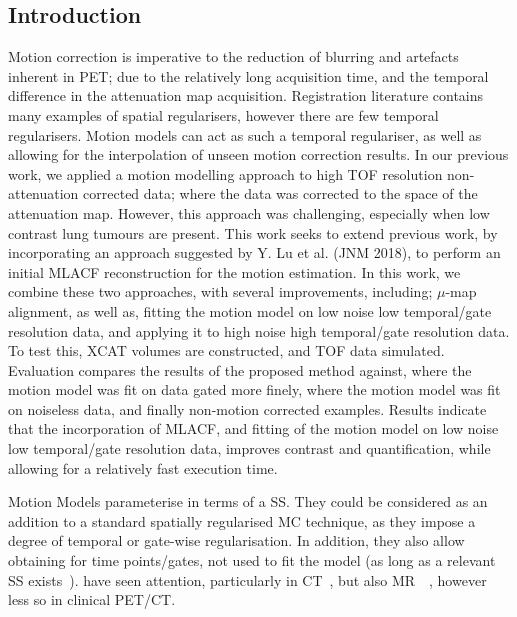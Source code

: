         \subsection{Introduction} \label{sec:pet_ct_motion_correction_exploiting_motion_models_fit_on_coarsely_gated_data_applied_to_finely_gated_data_introduction}
            Motion correction is imperative to the reduction of blurring and artefacts inherent in PET; due to the relatively long acquisition time, and the temporal difference in the attenuation map acquisition. Registration literature contains many examples of spatial regularisers, however there are few temporal regularisers. Motion models can act as such a temporal regulariser, as well as allowing for the interpolation of unseen motion correction results. In our previous work, we applied a motion modelling approach to high TOF resolution non-attenuation corrected data; where the data was corrected to the space of the attenuation map. However, this approach was challenging, especially when low contrast lung tumours are present. This work seeks to extend previous work, by incorporating an approach suggested by Y. Lu et al. (JNM 2018), to perform an initial MLACF reconstruction for the motion estimation. In this work, we combine these two approaches, with several improvements, including; $\mu$-map alignment, as well as, fitting the motion model on low noise low temporal/gate resolution data, and applying it to high noise high temporal/gate resolution data. To test this, %
            XCAT volumes are constructed, and TOF data simulated. Evaluation compares the results of the proposed method against, where the motion model was fit on data gated more finely, where the motion model was fit on noiseless data, and finally non-motion corrected examples. Results indicate that the incorporation of MLACF, and fitting of the motion model on low noise low temporal/gate resolution data, improves contrast and quantification, while allowing for a relatively fast execution time.
            
            Motion Models parameterise  in terms of a \gls{SS}. They could be considered as an addition to a standard spatially regularised \gls{MC} technique, as they impose a degree of temporal or gate-wise regularisation. In addition, they also allow obtaining  for time points/gates, not used to fit the model (as long as a relevant \gls{SS} exists~\parencite{McClelland2013}).  have seen attention, particularly in \gls{CT}~\parencite{Li2007EnhancedModel}, but also \gls{MR}~\parencite{Manke2002RespiratoryModels}~\parencite{Manber2016JointCorrection.}, however less so in clinical \gls{PET}/\gls{CT}.
            
